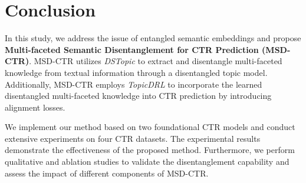 \chapter{Conclusion}

In this study, we address the issue of entangled semantic embeddings and propose \textbf{Multi-faceted Semantic Disentanglement for CTR Prediction (MSD-CTR)}. MSD-CTR utilizes \textit{DSTopic} to extract and disentangle multi-faceted knowledge from textual information through a disentangled topic model. Additionally, MSD-CTR employs \textit{TopicDRL} to incorporate the learned disentangled multi-faceted knowledge into CTR prediction by introducing alignment losses.

We implement our method based on two foundational CTR models and conduct extensive experiments on four CTR datasets. The experimental results demonstrate the effectiveness of the proposed method. Furthermore, we perform qualitative and ablation studies to validate the disentanglement capability and assess the impact of different components of MSD-CTR.
